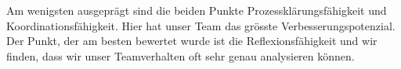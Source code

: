
Am wenigsten ausgeprägt sind die beiden Punkte Prozessklärungsfähigkeit und Koordinationsfähigkeit. Hier hat unser Team das grösste Verbesserungspotenzial. Der Punkt, der am besten bewertet wurde ist die Reflexionsfähigkeit und wir finden, dass wir unser Teamverhalten oft sehr genau analysieren können. 

\begin{comment}
Nach unseren individuell erstellten Selbsteinsch"atzungen, folgen nun die Fremdeinsch"atzungen, welche f"ur
den Vergleich von Selbst- und Fremdbild unabdingbar sind.
Dazu hat jedes Teammitglied seine eigene Form der Bearbeitung gew"ahlt. Dies war einerseits der Selbsteinsch"atzungstest, andererseits wurden anhand von spezifisch beobachteten Situationen eine Teamrollenzuteilung
vorgenommen.
\subsection*{Pascal Horat}

Auch um meine Teamkameraden einzuschätzen habe ich mich des vorher beschriebenen Belbin-Tests bedient. Dies vor allem aus drei Gründen:
\begin{enumerate}
\item Durch die vorgegebene Form ergibt sich meiner Meinung nach eine neutralere Betrachtung der Teamitglieder, da meine Einschätzung nicht nur auf ein bis zwei spezifischen Vorfällen beruht.
\item Durch die vorgegebene Form mit den Aussagen werde ich durch das Verfahren geleitet und muss nicht selber etwas entwickeln.
\item Da für die Bestimmung der Selbst- sowie der Fremdeinschätzung derselbe Test verwendet wurde, können direkte Vergleiche zwischen den Teammitgliedern gemacht werden.
\end{enumerate}

Dies hat für Gerome folgende Resultate hervorgebracht:



Von meinen Teammitgliedern fiel es mir, ohne die Hilfe des Tests, schwieriger, Gerome eine passende Rolle zuzuteilen. Darum hätte ich eine ausgeglichenere Punkteverteilung bei der Auswertung erwartet. Die Rolle des Ausgleichers, bei welcher er am meisten Punkte sammelte, finde ich jedoch passend. Dass sie bei ihm aber so ausgeprägt zum Zuge kommt, hat mich eher überrascht.

Bei Gökhan sieht die Auswertetabelle folgendermassen aus:




\end{comment}

